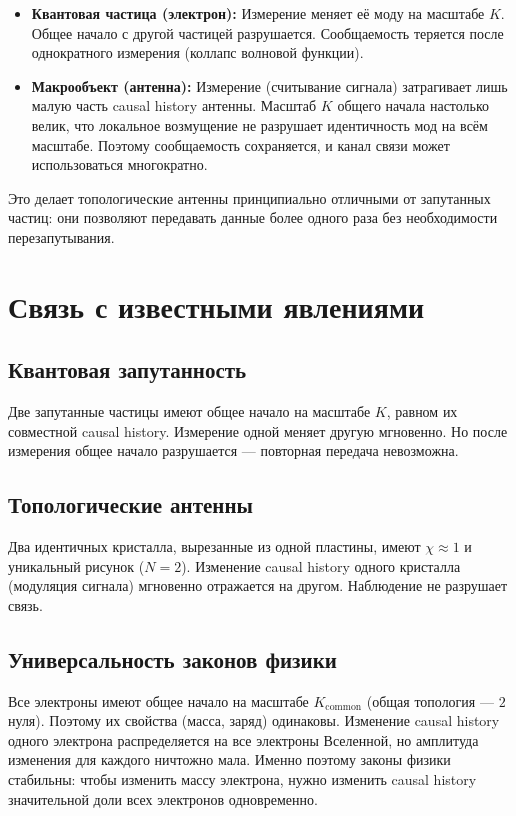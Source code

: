 \documentclass[12pt,a4paper]{article}
\begin{document}
\begin{itemize}
    \item \textbf{Квантовая частица (электрон):} Измерение меняет её моду на масштабе $K$. Общее начало с другой частицей разрушается. Сообщаемость теряется после однократного измерения (коллапс волновой функции).
    \item \textbf{Макрообъект (антенна):} Измерение (считывание сигнала) затрагивает лишь малую часть causal history антенны. Масштаб $K$ общего начала настолько велик, что локальное возмущение не разрушает идентичность мод на всём масштабе. Поэтому сообщаемость сохраняется, и канал связи может использоваться многократно.
\end{itemize}

Это делает топологические антенны принципиально отличными от запутанных частиц: они позволяют передавать данные более одного раза без необходимости перезапутывания.

\section{Связь с известными явлениями}

\subsection{Квантовая запутанность}
Две запутанные частицы имеют общее начало на масштабе $K$, равном их совместной causal history. Измерение одной меняет другую мгновенно. Но после измерения общее начало разрушается --- повторная передача невозможна.

\subsection{Топологические антенны}
Два идентичных кристалла, вырезанные из одной пластины, имеют $\chi \approx 1$ и уникальный рисунок ($N = 2$). Изменение causal history одного кристалла (модуляция сигнала) мгновенно отражается на другом. Наблюдение не разрушает связь.

\subsection{Универсальность законов физики}
Все электроны имеют общее начало на масштабе $K_{\text{common}}$ (общая топология --- $2$ нуля). Поэтому их свойства (масса, заряд) одинаковы. Изменение causal history одного электрона распределяется на все электроны Вселенной, но амплитуда изменения для каждого ничтожно мала. Именно поэтому законы физики стабильны: чтобы изменить массу электрона, нужно изменить causal history значительной доли всех электронов одновременно.
\end{document}

